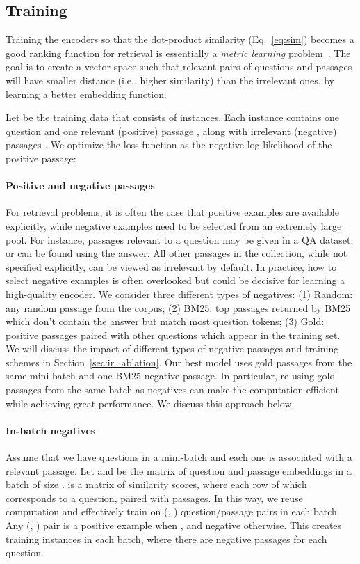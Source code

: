 \documentclass[11pt,a4paper]{article}
\begin{document}
\subsection{Training}\label{sec:training}

Training the encoders so that the dot-product similarity (Eq.~\eqref{eq:sim}) becomes a good ranking function for retrieval is essentially a \emph{metric learning} problem~\cite{kulis2013metric}.
The goal is to create a vector space such that relevant pairs of questions and passages will have smaller distance (i.e., higher similarity) than the irrelevant ones, by learning a better embedding function.

Let  be the training data that consists of  instances.
Each instance contains one question  and one relevant (positive) passage , along with  irrelevant (negative) passages .
We optimize the loss function as the negative log likelihood of the positive passage:


\paragraph{Positive and negative passages}
For retrieval problems, it is often the case that positive examples are available explicitly, while negative examples need to be selected from an extremely large pool.
For instance, passages relevant to a question may be given in a QA dataset, or can be found using the answer.
All other passages in the collection, while not specified explicitly, can be viewed as irrelevant by default.
In practice, how to select negative examples is often overlooked but could be decisive for learning a high-quality encoder.
We consider three different types of negatives: (1) Random: any random passage from the corpus; (2) BM25: top passages returned by BM25 which don't contain the answer but match most question tokens; (3) Gold: positive passages paired with other questions which appear in the training set. We will discuss the impact of different types of negative passages and training schemes in Section~\ref{sec:ir_ablation}.
Our best model uses gold passages from the same mini-batch and one BM25 negative passage.
In particular, re-using gold passages from the same batch as negatives can make the computation efficient while achieving great performance.
We discuss this approach below.

\paragraph{In-batch negatives}
Assume that we have  questions in a mini-batch and each one is associated with a relevant passage. Let  and  be the  matrix of question and passage embeddings in a batch of size .
 is a  matrix of similarity scores, where each row of which corresponds to a question, paired with  passages.
In this way, we reuse computation and effectively train on  (, ) question/passage pairs in each batch.
Any (, ) pair is a positive example when , and negative otherwise.
This creates  training instances in each batch, where there are  negative passages for each question.
\end{document}
